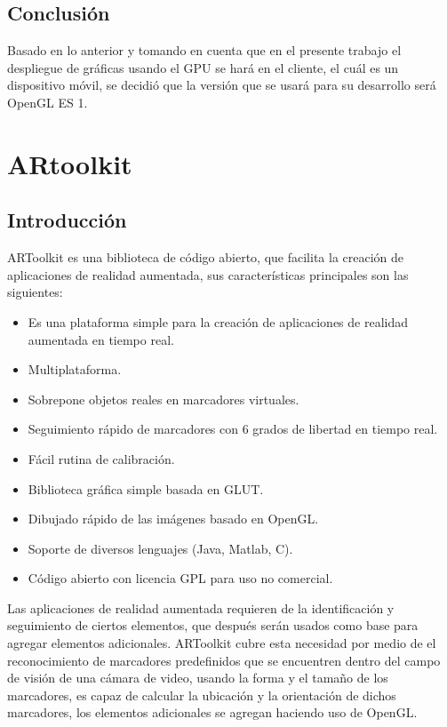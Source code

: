 \documentclass[12pt,a4paper,spanish,openany]{book}
\begin{document}
\subsection{Conclusión}

Basado en lo anterior y tomando en cuenta que en el presente trabajo el
despliegue de gráficas usando el GPU se hará en el cliente, el cuál es un
dispositivo móvil, se decidió que la versión que se usará para su desarrollo
será OpenGL ES 1.




\section{ARtoolkit}

\subsection{Introducción}

ARToolkit es una biblioteca de código abierto, que facilita la
creación de aplicaciones de realidad aumentada, sus características principales
son las siguientes:

\begin{itemize}
 \item Es una plataforma simple para la creación de aplicaciones de realidad aumentada
en tiempo real.
\item  Multiplataforma.
\item Sobrepone objetos reales en marcadores virtuales.
\item Seguimiento rápido de marcadores con 6 grados de libertad en tiempo real.
\item Fácil rutina de calibración.
\item Biblioteca gráfica simple basada en GLUT.
\item Dibujado rápido de las imágenes basado en OpenGL.
\item Soporte de diversos lenguajes (Java, Matlab, C).
\item Código abierto con licencia GPL para uso no comercial.
\end{itemize} \cite{artkfl}

Las aplicaciones de realidad aumentada requieren de la identificación y
seguimiento de ciertos elementos, que después serán usados como base para
agregar elementos adicionales. ARToolkit cubre esta necesidad por medio de el
reconocimiento de marcadores predefinidos que se encuentren dentro del campo de
visión de una cámara de video, usando la forma y el tamaño de los marcadores, es
capaz de calcular la ubicación y la orientación de dichos marcadores, los
elementos adicionales se agregan haciendo uso de OpenGL.
\cite{Gaukrodger:2007:ARA:1328491.1328504}
\end{document}
